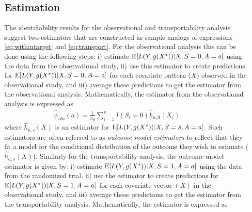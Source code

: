 \documentclass[11pt]{article}
\DeclareMathOperator{\E}{\textnormal{\mbox{E}}}
\begin{document}

\subsection*{Estimation}

The identifiability results for the observational and transportability analysis suggest two estimators that are constructed as sample analogs of expressions \eqref{eq:withintarget} and \eqref{eq:transport}. For the observational analysis this can be done using the following steps: i) estimate $\E[L(Y, g(X^*)) |X, S=0, A=a]$ using the data from the observational study, ii) use this estimator to create predictions for $\E[L(Y, g(X^*)) |X, S=0, A=a]$ for each covariate pattern ($X$) observed in the observational study, and iii) average these predictions to get the estimator from the observational analysis. Mathematically, the  estimator from the observational analysis is expressed as
\begin{align*}
    \widehat\psi_{obs}(a) = \frac{1}{n_0} \sum_{i=1}^n I(S_i=0) \widehat h_{a,0}(X_i), \hspace{1cm} %
\end{align*}
where $\widehat h_{a,s}(X)$ is an estimator for $\E[L(Y, g(X^*)) |X, S=s, A=a]$. Such estimators are often referred to as \textit{outcome model estimators} \cite{boyer2023new, morrison_robust_nodate} to reflect that they fit a model for the conditional distribution of the  outcome they wish to estimate ($\widehat h_{a,s}(X)$). %
Similarly for the transportability analysis, the outcome model estimator is given by: i) estimate $\E[L(Y, g(X^*)) |X, S=1, A=a]$ using the data from the randomized trial, ii) use the estimator to create predictions for $\E[L(Y, g(X^*)) |X, S=1, A=a]$ for each covariate vector $(X)$ in the observational study, and iii) average these predictions to get the estimator from the transportability analysis. Mathematically, the estimator is expressed as
\end{document}
